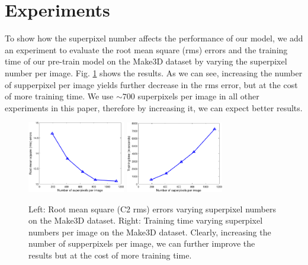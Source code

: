 



\section{Experiments}
To show how the superpixel number affects the performance of our model, we add an experiment to evaluate the root mean square (rms) errors and the training time of our pre-train model on the Make3D dataset by varying the superpixel number per image.
Fig. \ref{fig:rmsVSspnum} shows the results.
As we can see, increasing the number of supperpixel per image yields further decrease in the rms error, but at the cost of more training time.
We use $\sim 700$ superpixels per image in all other experiments in this paper, therefore by increasing it, we can expect better results.


\begin{figure} \center
     \includegraphics[width=0.38\textwidth, height=0.28\textwidth]{./fig/Make3D/rmsVSspNum.pdf}
     \includegraphics[width=0.38\textwidth, height=0.28\textwidth]{./fig/Make3D/timeVSspNum.pdf}
\caption{Left: Root mean square (C2 rms)  errors  \vs  varying superpixel numbers on the Make3D dataset.
Right: Training time \vs varying superpixel numbers per image on the Make3D dataset.
Clearly, increasing the number of supperpixels per image, we can further improve the results but at the cost of more training time.}  \label{fig:rmsVSspnum}
\end{figure}


